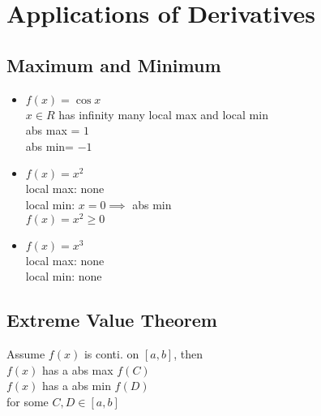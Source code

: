 %
%
\graphicspath{{figures/applications/}}

\chapter{Applications of Derivatives}
\section{Maximum and Minimum}
\begin{eg}
\begin{itemize}
\item $f(x) = \cos x$\\
$x \in R$ has infinity many local max and local min\\
abs max = $1$\\
abs min= $-1$
\item $f(x) = x^2$\\
local max: none\\
local min: $x= 0 \implies $ abs min\\
$f(x) = x^2 \geq 0$
\item $f(x) = x^3$\\
local max: none\\
local min: none
\end{itemize}
\end{eg}
\section{Extreme Value Theorem}
\begin{theorem}
Assume $f(x)$ is conti. on $[a, b]$, then\\
$f(x)$ has a abs max $f(C)$\\
$f(x)$ has a abs min $f(D)$\\
for some $C, D \in [a, b]$
\end{theorem}
